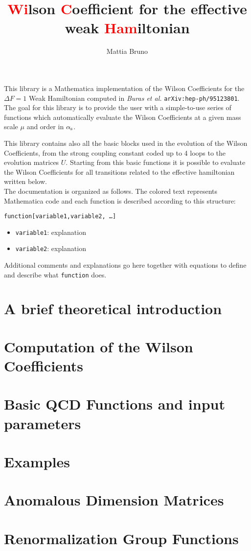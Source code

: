 \documentclass[a4paper]{scrartcl}
\title{\textcolor{red}{Wi}lson \textcolor{red}{C}oefficient for the effective weak \textcolor{red}{Ham}iltonian}
\author{Mattia Bruno}
\newcommand{\as}{\alpha_{\rm s}}
\newcommand{\code}[1]{\noindent\textcolor{RedOrange}{\texttt{#1}}}
\begin{document}
\maketitle

This library is a Mathematica implementation of the Wilson Coefficients 
for the $\Delta F=1$ Weak Hamiltonian computed in \textit{Buras et al.} 
\texttt{arXiv:hep-ph/95123801}.
The goal for this library is to provide the user with a simple-to-use 
series of functions which automatically evaluate the Wilson Coefficients 
at a given mass scale $\mu$ and order in $\as$.

This library contains also all the basic blocks used in the evolution of the 
Wilson Coefficients, from the strong coupling constant coded up to 4 loops to the 
evolution matrices $U$. Starting from this basic functions it is possible to 
evaluate the Wilson Coefficients for all transitions related to the effective
hamiltonian written below.\\

The documentation is organized as follows. The colored text represents 
Mathematica code and each function is described according to this structure:

\hrulefill

\code{function[variable1,variable2, \ldots]}\\
\begin{itemize}
\item \code{variable1}: explanation
\item \code{variable2}: explanation
\end{itemize}

Additional comments and explanations go here together with
equations to define and describe what \code{function} does.

\newpage
\section{A brief theoretical introduction}


\newpage
\section{Computation of the Wilson Coefficients}


\newpage
\section{Basic QCD Functions and input parameters}


\newpage
\section{Examples}


\newpage
\section{Anomalous Dimension Matrices}


\section{Renormalization Group Functions}

\end{document}
